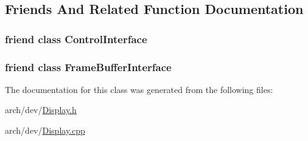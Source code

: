 \subsection{Friends And Related Function Documentation}
\hypertarget{class_simulator_1_1_display_a40db1df984344b6204f9c8a338aacabb}{
\subsubsection[{Control\+Interface}]{\setlength{\rightskip}{0pt plus 5cm}friend class Control\+Interface\hspace{0.3cm}{\ttfamily [friend]}}}\label{class_simulator_1_1_display_a40db1df984344b6204f9c8a338aacabb}
\hypertarget{class_simulator_1_1_display_a8ecdedbbf356339204e1e013df18699b}{
\subsubsection[{Frame\+Buffer\+Interface}]{\setlength{\rightskip}{0pt plus 5cm}friend class Frame\+Buffer\+Interface\hspace{0.3cm}{\ttfamily [friend]}}}\label{class_simulator_1_1_display_a8ecdedbbf356339204e1e013df18699b}


The documentation for this class was generated from the following files\+:\begin{DoxyCompactItemize}
\item 
arch/dev/\hyperlink{_display_8h}{Display.\+h}\item 
arch/dev/\hyperlink{_display_8cpp}{Display.\+cpp}\end{DoxyCompactItemize}
